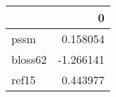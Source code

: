 \begin{tabular}{lr}
\toprule
{} &         0 \\
\midrule
pssm    &  0.158054 \\
bloss62 & -1.266141 \\
ref15   &  0.443977 \\
\bottomrule
\end{tabular}
